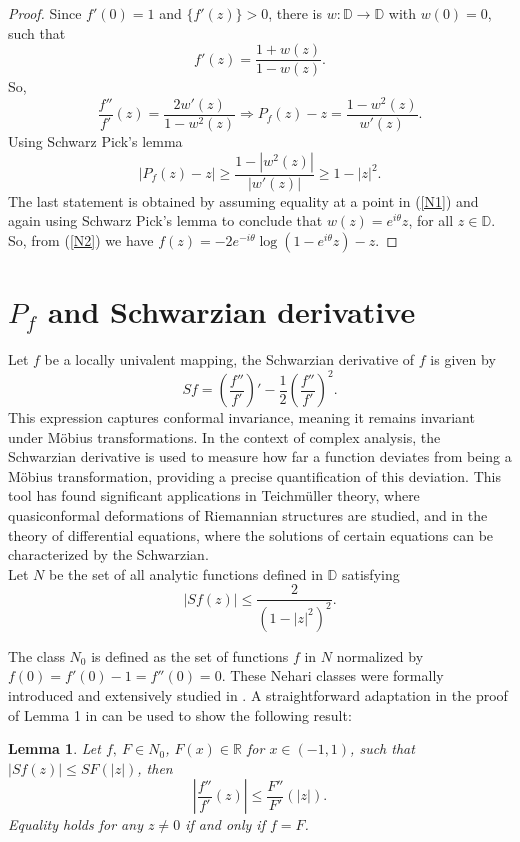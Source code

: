 \documentclass[reqno]{amsart}
\theoremstyle{plain}
\newtheorem{lemma}[theo]{Lemma}
\theoremstyle{definition}
\newcommand{\D}{\mathbb{D}}
\newcommand{\R}{\mathbb{R}}
\begin{document}
\begin{proof}
 Since $f'(0)=1$ and $\{f'(z)\}>0$, there is $w:\D \to \D$ with $w(0)=0$, such that
\begin{equation}\label{N2}
  f'(z)=\frac{1+w(z)}{1-w(z)}.  
\end{equation}
So,
\[\frac{f''}{f'}(z)=\frac{2w'(z)}{1-w^2(z)} \Rightarrow P_f(z)-z=\frac{1-w^2(z)}{w'(z)}.\]
Using Schwarz Pick's lemma
\begin{equation}\label{N1}
 |P_f(z)-z|\geq\frac{1-|w^2(z)|}{|w'(z)|}\geq 1-|z|^2.  
\end{equation}
The last statement is obtained by assuming equality at a point in (\ref{N1}) and again using Schwarz Pick's lemma to conclude that $w(z)=e^{i\theta}z$, for all $z\in \D$. So, from (\ref{N2}) we have $f(z)=-2e^{-i\theta}\log(1-e^{i\theta}z)-z.$
\end{proof}

\section{$P_f$ and Schwarzian derivative}

Let $f$ be a locally univalent mapping, the Schwarzian derivative of $f$ is given by
\[Sf=\left(\dfrac{f''}{f'}\right)'-\frac12\left(\dfrac{f''}{f'}\right)^2.\] This expression captures conformal invariance, meaning it remains invariant under Möbius transformations. In the context of complex analysis, the Schwarzian derivative is used to measure how far a function deviates from being a Möbius transformation, providing a precise quantification of this deviation. This tool has found significant applications in Teichmüller theory, where quasiconformal deformations of Riemannian structures are studied, and in the theory of differential equations, where the solutions of certain equations can be characterized by the Schwarzian.\\
Let $N$ be the set of all analytic functions defined in $\D$ satisfying
\[|Sf(z)|\leq \frac{2}{(1-|z|^2)^2}.\]

The class $N_0$ is defined as the set of functions $f$ in $N$ normalized by $f(0)=f'(0)-1=f''(0)=0.$ These Nehari classes were formally introduced and extensively studied in \cite{Chuaqui1996}. A straightforward adaptation in the proof of Lemma 1 in \cite{Chuaqui1994} can be used to show the following result:

\begin{lemma} \label{Lemma f, F}
Let $f,\ F \in N_0$, $F(x)\in \R$ for $x\in (-1,1)$, such that $|Sf(z)|\leq SF(|z|)$, then $$\left|\dfrac{f''}{f'}(z)\right|\leq \dfrac{F''}{F'}(|z|).$$    
Equality holds for any $z\neq 0$ if and only if $f=F$.
\end{lemma}
\end{document}
